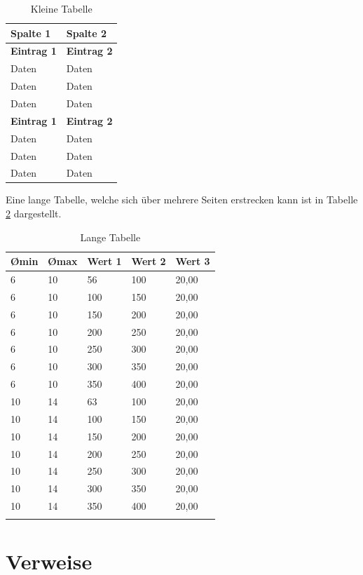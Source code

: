 \begin{table}[htbp]
\centering
\begin{tabular}{p{3.5cm} p{5.5cm}}
\toprule
\textbf{Spalte 1}  & \textbf{Spalte 2}\\
\midrule
\textbf{Eintrag 1} & \textbf{Eintrag 2}\\
Daten              & Daten\\
Daten              & Daten\\
Daten              & Daten\\
\midrule
\textbf{Eintrag 1} & \textbf{Eintrag 2}\\
Daten              & Daten\\
Daten              & Daten\\
Daten              & Daten\\
\bottomrule
\end{tabular}
\caption{Kleine Tabelle}
\label{tab:feste-breite}
\end{table}

Eine lange Tabelle, welche sich über mehrere Seiten erstrecken kann ist in Tabelle \ref{tab:lange-tabelle} dargestellt.

\begin{longtable}{p{2cm} p{2cm} p{2cm} p{2cm} p{2cm}}
\toprule
\textbf{\O min}& \textbf{\O max}& \textbf{Wert 1}& \textbf{Wert 2}& \textbf{Wert 3}\\
\midrule
 6& 10&  56& 100& 20,00\\
 6& 10& 100& 150& 20,00\\
 6& 10& 150& 200& 20,00\\
 6& 10& 200& 250& 20,00\\
 6& 10& 250& 300& 20,00\\
 6& 10& 300& 350& 20,00\\
 6& 10& 350& 400& 20,00\\
10& 14&  63& 100& 20,00\\
10& 14& 100& 150& 20,00\\
10& 14& 150& 200& 20,00\\
10& 14& 200& 250& 20,00\\
10& 14& 250& 300& 20,00\\
10& 14& 300& 350& 20,00\\
10& 14& 350& 400& 20,00\\
\bottomrule
\caption{Lange Tabelle}
\label{tab:lange-tabelle}
\end{longtable}

\section{Verweise}

